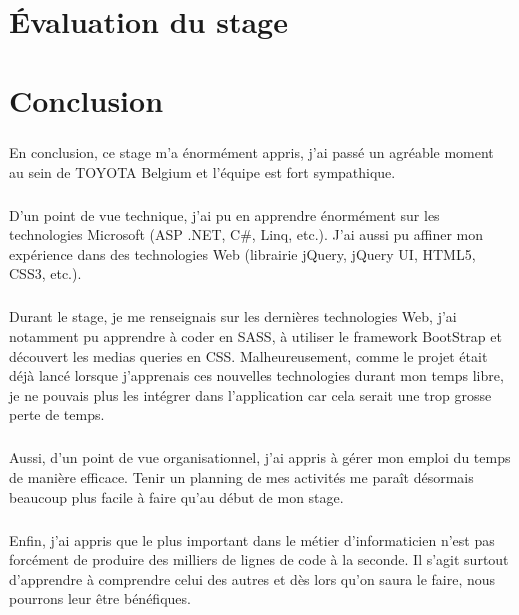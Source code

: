 \documentclass[12pt]{report}
\begin{document}
\chapter{Évaluation du stage}

\chapter{Conclusion}
\paragraph{}
En conclusion, ce stage m'a énormément appris, j'ai passé un agréable moment au sein de TOYOTA Belgium et l'équipe est fort sympathique.
\paragraph{}
D'un point de vue technique, j'ai pu en apprendre énormément sur les technologies Microsoft (ASP .NET, C\#, Linq, etc.). J'ai aussi pu affiner mon expérience dans des technologies Web (librairie jQuery, jQuery UI, HTML5, CSS3, etc.).
\paragraph{}
Durant le stage, je me renseignais sur les dernières technologies Web, j'ai notamment pu apprendre à coder en SASS, à utiliser le framework BootStrap et découvert les medias queries en CSS. 
Malheureusement, comme le projet était déjà lancé lorsque j'apprenais ces nouvelles technologies durant mon temps libre, je ne pouvais plus les intégrer dans l'application car cela serait une trop grosse perte de temps.

\paragraph{}
Aussi, d'un point de vue organisationnel, j'ai appris à gérer mon emploi du temps de manière efficace. Tenir un planning de mes activités me paraît désormais beaucoup plus facile à faire qu'au début de mon stage. 

\paragraph{}
Enfin, j'ai appris que le plus important dans le métier d'informaticien n'est pas forcément de produire des milliers de lignes de code à la seconde. 
Il s'agit surtout d'apprendre à comprendre celui des autres et dès lors qu'on saura le faire, nous pourrons leur être bénéfiques.

\nocite{*}
\printbibliography
\end{document}
